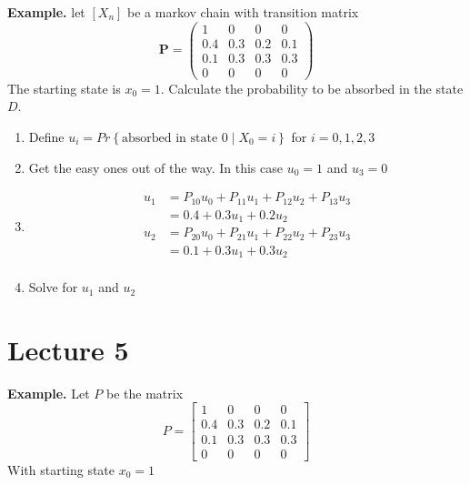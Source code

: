 \documentclass{article}
\theoremstyle{remark}
\begin{document}
     \begin{tcolorbox}
       \textbf{Example.} let $\left[ X_{n} \right]$ be a markov chain with transition matrix \[
       \mathbf{P} = \begin{pmatrix}
       1  &  0 &  0  &  0 \\
       0.4  &  0.3  &  0.2  &  0.1 \\
       0.1  &  0.3  &  0.3 &  0.3 \\
       0  &  0 &  0 &  0
       \end{pmatrix}
       \]
       The starting state is $x_{0} = 1$. Calculate the probability to be absorbed in the state $D$.
       \begin{enumerate}
         \item Define $u_{i} = Pr \left \{ \text{absorbed in state 0}  \mid  X _{0} = i \right \} $ for $i = 0,1,2,3$
         \item Get the easy ones out of the way. In this case $u_{0} = 1$ and $u_{3} = 0$
         \item
           \[
           \begin{split}
            u_{1}  &  = P_{10} u_{0} + P_{11} u_{1} + P_{12} u_{2} + P_{13}u_{3}  \\
            &= 0.4 + 0.3 u_{1} + 0.2 u_{2}  \\
            u_{2} &= P_{20} u_{0} + P_{21} u_{1} + P_{22} u_{2} + P_{23} u_{3} \\
            &= 0.1 + 0.3 u_{1} + 0.3 u _{2} \\
           \end{split}
           \]
         \item Solve for $u_{1}$ and $u_{2}$
       \end{enumerate}
     \end{tcolorbox}

\newpage
\section{Lecture 5}%
\label{sec:lecture_5}

\textbf{Example.} Let $P$ be the matrix \[
P = \begin{bmatrix}
1  & 0  &  0 &  0 \\
0.4  &  0.3  &  0.2  &  0.1 \\
0.1   &  0.3  &  0.3  &  0.3 \\
0  &  0  &  0 &  0
\end{bmatrix}
\]
With starting state $x_{0} = 1$
\end{document}
